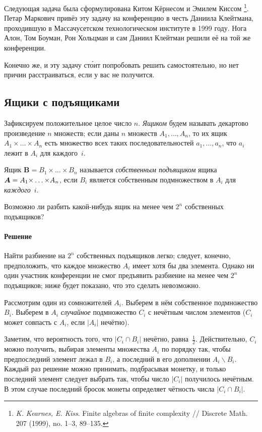 \documentclass[twoside]{book}
\makeatletter
\newcommand{\rindex}[2][\imki@jobname]{%
  \index[#1]{\detokenize{#2}}%
}
\makeatother
\begin{document}
\medskip

Следующая задача была сформулирована
Китом Кёрнесом %
и Эмилем Киссом%
\footnote{\emph{K. Kearnes, E. Kiss}. Finite algebras of finite complexity /\!/ {Discrete Math.} 207 (1999), no. 1--3, 89--135.}.
Петар Маркович привёз эту задачу на конференцию в честь Даниила Клейтмана, проходившую в Массачусетском технологическом институте в 1999 году.
Нога Алон, Том Боуман, Рон Хольцман и сам Даниил Клейтман решили её на той же конференции.

Конечно же, и эту задачу ст\'{о}ит попробовать решить самостоятельно, но нет причин расстраиваться, если у вас не получится.

\subsection*{Ящики с подъящиками}
\rindex{Ящики с подъящиками}

Зафиксируем положительное целое число $n$.
\emph{Ящиком} будем называть декартово произведение $n$ множеств;
если даны $n$ множеств $A_1,\dots,A_n$, то их ящик $A_1{\times}\dots{\times}A_n$ есть множество всех таких последовательностей $a_1,\dots,a_n$, что $a_i$ лежит в $A_i$ для каждого~$i$.

Ящик $\bm{B}=B_1{\times}\dots{\times}B_n$ называется \emph{собственным подъящиком} ящика $\bm{A}\z=A_1{\times}\z\dots{\times}A_n$, если $B_i$ является собственным подмножеством в $A_i$ для \emph{каждого}~$i$.

Возможно ли разбить какой-нибудь ящик на менее чем $2^n$ собственных подъящиков?

\paragraph{Решение}
Найти разбиение на $2^n$ собственных подъящиков легко; следует, конечно, предположить, что каждое множество $A_i$ имеет хотя бы два элемента.
Однако ни один участник конференции не смог предъявить разбиение на менее чем $2^n$ подъящиков; ниже будет показано, что это сделать невозможно.

Рассмотрим один из сомножителей $A_i$. 
Выберем в нём собственное подмножество $B_i$.
Выберем в $A_i$ \emph{случайное} подмножество $C_i$ с нечётным числом элементов ($C_i$ может совпасть с $A_i$, если $|A_i|$ нечётно).

Заметим, что вероятность того, что $|C_i\cap B_i|$ нечётно, равна~$\tfrac12$.
Действительно, $C_i$ можно получить, выбирая элементы множества $A_i$ по порядку так, чтобы предпоследний элемент лежал в $B_i$, а последний в его дополнении $A_i\backslash B_i$.
Каждый раз решение можно принимать, подбрасывая монетку, и только последний элемент следует выбрать так, чтобы число $|C_i|$ получилось нечётным.
В этом случае последний бросок монеты определяет чётность числа $|C_i\cap B_i|$.
\end{document}
